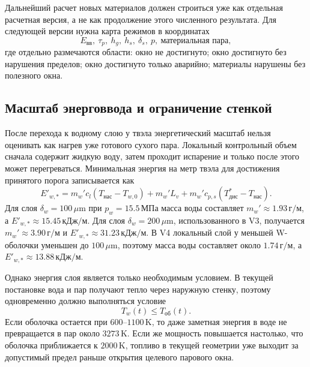 \documentclass[12pt]{article}
\begin{document}
Дальнейший расчет новых материалов должен строиться уже как отдельная расчетная версия, а не как продолжение этого численного результата. Для следующей версии нужна карта режимов в координатах
\[
E_{\mathrm{вв}},\ \tau_p,\ h_g,\ h_s,\ \delta_s,\ p,\ \text{материальная пара},
\]
где отдельно размечаются области: окно не достигнуто; окно достигнуто без нарушения пределов; окно достигнуто только аварийно; материалы нарушены без полезного окна.

\subsection{Масштаб энерговвода и ограничение стенкой}

После перехода к водному слою у твэла энергетический масштаб нельзя оценивать как нагрев уже готового сухого пара. Локальный контрольный объем сначала содержит жидкую воду, затем проходит испарение и только после этого может перегреваться. Минимальная энергия на метр твэла для достижения принятого порога записывается как
\[
E'_{w,*}=
m_w'c_l\left(T_{\mathrm{нас}}-T_{w,0}\right)
+m_w'L_v
+m_w'c_{p,s}\left(T^*_{\mathrm{дис}}-T_{\mathrm{нас}}\right).
\]
Для слоя \(\delta_w=100\,\mu\mathrm{m}\) при \(p_w=15.5\,\mathrm{МПа}\) масса воды составляет \(m_w'\approx1.93\,\mathrm{г/м}\), а \(E'_{w,*}\approx15.45\,\mathrm{кДж/м}\). Для слоя \(\delta_w=200\,\mu\mathrm{m}\), использованного в V3, получается \(m_w'\approx3.90\,\mathrm{г/м}\) и \(E'_{w,*}\approx31.23\,\mathrm{кДж/м}\). В V4 локальный слой у меньшей W-оболочки уменьшен до \(100\,\mu\mathrm{m}\), поэтому масса воды составляет около \(1.74\,\mathrm{г/м}\), а \(E'_{w,*}\approx13.88\,\mathrm{кДж/м}\).

Однако энергия слоя является только необходимым условием. В текущей постановке вода и пар получают тепло через наружную стенку, поэтому одновременно должно выполняться условие
\[
T_w(t)\le T_{\mathrm{об}}(t).
\]
Если оболочка остается при \(600\text{--}1100\,\mathrm{K}\), то даже заметная энергия в воде не превращается в пар около \(3273\,\mathrm{K}\). Если же мощность повышается настолько, что оболочка приближается к \(2000\,\mathrm{K}\), топливо в текущей геометрии уже выходит за допустимый предел раньше открытия целевого парового окна.
\end{document}
